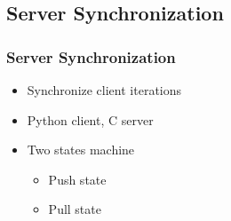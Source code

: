 \subsection{Server Synchronization}
\begin{frame}  
    \frametitle{Server Synchronization}
	\begin{itemize}
  		\item Synchronize client iterations	
		\item Python client, C server
		\item Two states machine		
		\begin{itemize}
  			\item Push state
			\item Pull state	
		\end{itemize}
	\end{itemize}
\end{frame}




